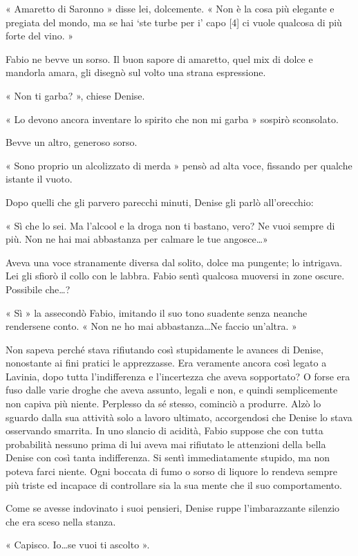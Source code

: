 « Amaretto di Saronno » disse lei, dolcemente. « Non è la cosa più elegante e pregiata del mondo, ma se hai `ste turbe per i' capo [4] ci vuole qualcosa di più forte del vino. »

Fabio ne bevve un sorso. Il buon sapore di amaretto, quel mix di dolce e mandorla amara, gli disegnò sul volto una strana espressione.

« Non ti garba? », chiese Denise.

« Lo devono ancora inventare lo spirito che non mi garba » sospirò sconsolato.

Bevve un altro, generoso sorso.

« Sono proprio un alcolizzato di merda » pensò ad alta voce, fissando per qualche istante il vuoto.

Dopo quelli che gli parvero parecchi minuti, Denise gli parlò all'orecchio:

« Sì che lo sei. Ma l'alcool e la droga non ti bastano, vero? Ne vuoi sempre di più. Non ne hai mai abbastanza per calmare le tue angosce\ldots »

Aveva una voce stranamente diversa dal solito, dolce ma pungente; lo intrigava. Lei gli sfiorò il collo con le labbra. Fabio sentì qualcosa muoversi in zone oscure. Possibile che\ldots?

« Sì » la assecondò Fabio, imitando il suo tono suadente senza neanche rendersene conto. « Non ne ho mai abbastanza\ldots Ne faccio un'altra. »

Non sapeva perché stava rifiutando così stupidamente le avances di Denise, nonostante ai fini pratici le apprezzasse. Era veramente ancora così legato a Lavinia, dopo tutta l'indifferenza e l'incertezza che aveva sopportato? O forse era fuso dalle varie droghe che aveva assunto, legali e non, e quindi semplicemente non capiva più niente. Perplesso da sé stesso, cominciò a produrre. Alzò lo sguardo dalla sua attività solo a lavoro ultimato, accorgendosi che Denise lo stava osservando smarrita. In uno slancio di acidità, Fabio suppose che con tutta probabilità nessuno prima di lui aveva mai rifiutato le attenzioni della bella Denise con così tanta indifferenza. Si sentì immediatamente stupido, ma non poteva farci niente. Ogni boccata di fumo o sorso di liquore lo rendeva sempre più triste ed incapace di controllare sia la sua mente che il suo comportamento.

Come se avesse indovinato i suoi pensieri, Denise ruppe l'imbarazzante silenzio che era sceso nella stanza.

« Capisco. Io\ldots se vuoi ti ascolto ».

